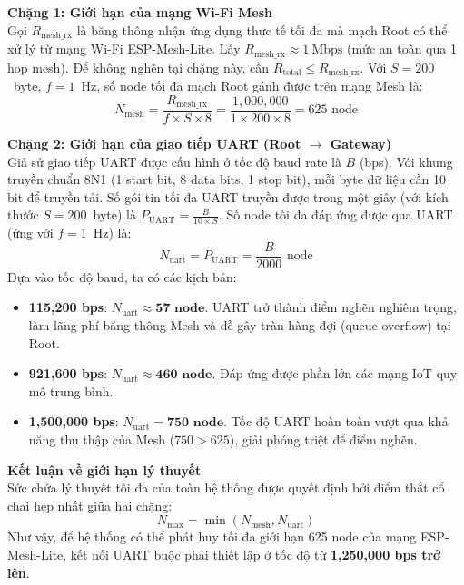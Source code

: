 \documentclass{article} %
\begin{document}
\textbf{Chặng 1: Giới hạn của mạng Wi-Fi Mesh}\\
Gọi $R_{\text{mesh\_rx}}$ là băng thông nhận ứng dụng thực tế tối đa mà mạch Root có thể xử lý từ mạng Wi-Fi ESP-Mesh-Lite. Lấy $R_{\text{mesh\_rx}} \approx 1~\text{Mbps}$ (mức an toàn qua 1 hop mesh). Để không nghẽn tại chặng này, cần $R_{\text{total}} \leq R_{\text{mesh\_rx}}$. Với $S = 200$~byte, $f = 1$~Hz, số node tối đa mạch Root gánh được trên mạng Mesh là:
\[
N_{\text{mesh}} = \frac{R_{\text{mesh\_rx}}}{f \times S \times 8} = \frac{1{,}000{,}000}{1 \times 200 \times 8} = 625 \text{ node}
\]

\textbf{Chặng 2: Giới hạn của giao tiếp UART (Root $\rightarrow$ Gateway)}\\
Giả sử giao tiếp UART được cấu hình ở tốc độ baud rate là $B$ (bps). Với khung truyền chuẩn 8N1 (1 start bit, 8 data bits, 1 stop bit), mỗi byte dữ liệu cần 10 bit để truyền tải. Số gói tin tối đa UART truyền được trong một giây (với kích thước $S = 200$~byte) là $P_{\text{UART}} = \frac{B}{10 \times S}$. Số node tối đa đáp ứng được qua UART (ứng với $f = 1$~Hz) là:
\[
N_{\text{uart}} = P_{\text{UART}} = \frac{B}{2000} \text{ node}
\]
Dựa vào tốc độ baud, ta có các kịch bản:
\begin{itemize}
    \item \textbf{115,200 bps}: $N_{\text{uart}} \approx \textbf{57 node}$. UART trở thành điểm nghẽn nghiêm trọng, làm lãng phí băng thông Mesh và dễ gây tràn hàng đợi (queue overflow) tại Root.
    \item \textbf{921,600 bps}: $N_{\text{uart}} \approx \textbf{460 node}$. Đáp ứng được phần lớn các mạng IoT quy mô trung bình.
    \item \textbf{1,500,000 bps}: $N_{\text{uart}} = \textbf{750 node}$. Tốc độ UART hoàn toàn vượt qua khả năng thu thập của Mesh ($750 > 625$), giải phóng triệt để điểm nghẽn.
\end{itemize}

\textbf{Kết luận về giới hạn lý thuyết}\\
Sức chứa lý thuyết tối đa của toàn hệ thống được quyết định bởi điểm thắt cổ chai hẹp nhất giữa hai chặng:
\[
N_{\text{max}} = \min(N_{\text{mesh}}, N_{\text{uart}})
\]
Như vậy, để hệ thống có thể phát huy tối đa giới hạn 625 node của mạng ESP-Mesh-Lite, kết nối UART buộc phải thiết lập ở tốc độ từ \textbf{1,250,000 bps trở lên}. 
\end{document}
